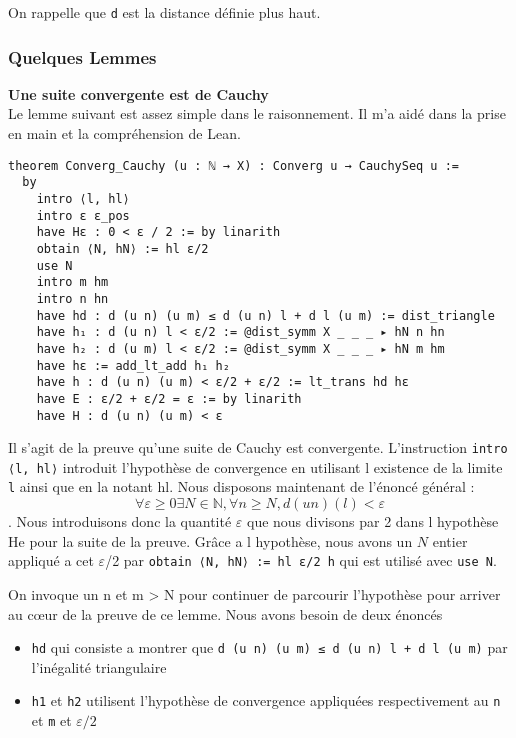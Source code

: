\documentclass[a4paper, 12pt]{article}
\newcommand{\lean}[1]{\texttt{#1}}
\begin{document}
On rappelle que \lean{d} est la distance définie plus haut.


\subsubsection{Quelques Lemmes}

\textbf{Une suite convergente est de Cauchy}\\

Le lemme suivant est assez simple dans le raisonnement. Il m'a aidé dans la prise en main et la compréhension de Lean.

\begin{verbatim}
theorem Converg_Cauchy (u : ℕ → X) : Converg u → CauchySeq u :=
  by
    intro ⟨l, hl⟩
    intro ε ε_pos
    have Hε : 0 < ε / 2 := by linarith
    obtain ⟨N, hN⟩ := hl ε/2
    use N
    intro m hm
    intro n hn
    have hd : d (u n) (u m) ≤ d (u n) l + d l (u m) := dist_triangle
    have h₁ : d (u n) l < ε/2 := @dist_symm X _ _ _ ▸ hN n hn
    have h₂ : d (u m) l < ε/2 := @dist_symm X _ _ _ ▸ hN m hm
    have hε := add_lt_add h₁ h₂
    have h : d (u n) (u m) < ε/2 + ε/2 := lt_trans hd hε
    have E : ε/2 + ε/2 = ε := by linarith
    have H : d (u n) (u m) < ε
\end{verbatim}


Il s'agit de la preuve qu'une suite de Cauchy est convergente.
L'instruction \lean{intro ⟨l, hl⟩} introduit l'hypothèse de convergence en utilisant l existence de la limite \lean{l} ainsi que en la notant hl. Nous disposons maintenant de l'énoncé général : $$\forall \varepsilon \geq 0 \exists N \in \mathbb{N},\forall n \geq N, d (u n) (l) < \varepsilon$$. Nous introduisons donc la quantité $\varepsilon$ que nous divisons par 2 dans l hypothèse He pour la suite de la preuve.
Grâce a l hypothèse, nous avons un $N$ entier appliqué a cet $\varepsilon$/2 par \lean{obtain ⟨N, hN⟩ := hl ε/2 h} qui est utilisé avec \lean{use N}.

On invoque un n et m > N pour continuer de parcourir l'hypothèse pour arriver au cœur de la preuve de ce lemme. Nous avons besoin de deux énoncés

\begin{itemize}
    \item \lean{hd} qui consiste a montrer que \lean{d (u n) (u m) ≤ d (u n) l + d l (u m)} par l'inégalité triangulaire
    \item \lean{h1} et \lean{h2} utilisent l'hypothèse de convergence appliquées respectivement au \lean{n} et \lean{m} et $\varepsilon/2$
\end{itemize}
\end{document}
